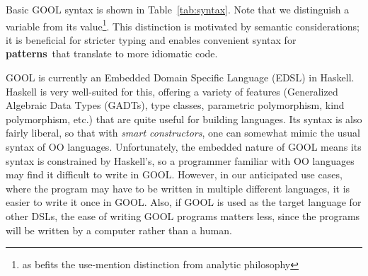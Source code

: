 \documentclass[sigplan,review,prologue,dvipsnames]{acmart}
\newcommand{\abbrev}[1]{\textbf{#1}}
\newcommand{\oopatterns}{\abbrev{patterns}}
\begin{document}
Basic GOOL syntax is shown in Table~\ref{tab:syntax}. Note that we 
distinguish a variable from its value\footnote{as befits the use-mention
distinction from analytic philosophy}. This distinction is motivated by
semantic considerations; it is beneficial for stricter typing and enables
convenient syntax for \oopatterns~that translate to more idiomatic code.

GOOL is currently an Embedded
Domain Specific Language (EDSL) in Haskell.  Haskell is very well-suited
for this, offering a variety of features (Generalized Algebraic Data Types 
(GADTs), type classes,
parametric polymorphism, kind polymorphism, etc.) that are quite useful
for building languages.  Its syntax is also fairly liberal, so that
with \emph{smart constructors}, one can somewhat mimic the
usual syntax of OO languages. Unfortunately, the embedded nature of GOOL means 
its syntax is constrained by Haskell's, so a programmer familiar with OO 
languages may find it difficult to write in GOOL. However, in our anticipated 
use cases, where the program may have to be written in multiple different 
languages, it is easier to write it once in GOOL. Also, if GOOL is used as the 
target language for other DSLs, the ease of writing GOOL programs matters less, 
since the programs will be written by a computer rather than a human. 
\end{document}
